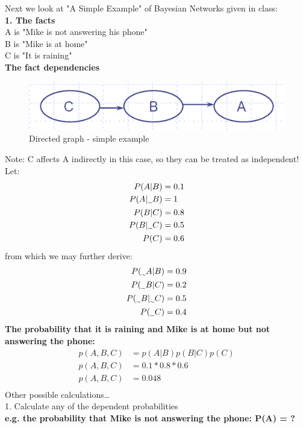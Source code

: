 Next we look at "A Simple Example" of Bayesian Networks given in class: \\
\textbf{1. The facts}\\
A is "Mike is not answering his phone" \\
B is "Mike is at home"\\
C is "It is raining"\\
\textbf{The fact dependencies} \\
\begin{figure}[H]
 \centering 
\includegraphics[scale=0.42]{images/mike-phone.png} 
 \caption{Directed graph - simple example}
 \label{fig:Mike}
\end{figure}
Note: C affects A indirectly in this case, so they can be treated as independent! \\
Let:
\begin{align*}
 P(A|B)& = 0.1 \\
 P(A|\midtilde B) & = 1 \\
P(B|C) & = 0.8 \\ 
P(B|\midtilde C) & = 0.5 \\
P(C) & = 0.6    \\
\end{align*}
from which we may further derive:
\begin{align*}
 P(\midtilde A|B)& = 0.9 \\
P(\midtilde B|C) & = 0.2 \\ 
P(\midtilde  B|\midtilde C) & = 0.5 \\
P(\midtilde  C) & = 0.4    \\
\end{align*}
\textbf{The probability that it is raining and Mike is at home but not answering the phone:} \\
\begin{align*}
p(A,B,C) & = p(A|B)p(B|C)p(C) \\
p(A,B,C) & = 0.1 * 0.8 * 0.6 \\
p(A,B,C) & = 0.048 \\
\end{align*}
Other possible calculations…\\
1. Calculate any of the dependent probabilities\\
\textbf{e.g. the probability that Mike is not answering the phone: P(A) = ?} \\
